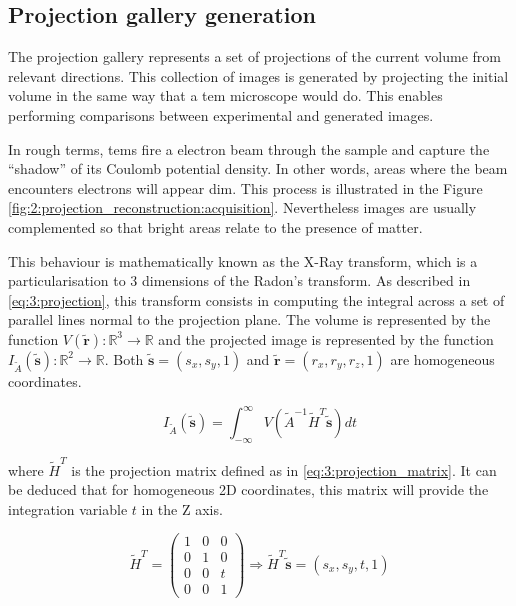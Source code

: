 \documentclass[../main.tex]{subfiles}
\begin{document}
\subsection{Projection gallery generation}
The projection gallery represents a set of projections of the current volume from relevant directions. This collection of images is generated by projecting the initial volume in the same way that a \gls{tem} microscope would do. This enables performing comparisons between experimental and generated images. 

In rough terms, \glspl{tem} fire a electron beam through the sample and capture the ``shadow'' of its Coulomb potential density\cite{sorzano2022}. In other words, areas where the beam encounters electrons will appear dim. This process is illustrated in the Figure \ref{fig:2:projection_reconstruction:acquisition}. Nevertheless images are usually complemented so that bright areas relate to the presence of matter.

This behaviour is mathematically known as the X-Ray transform, which is a particularisation to 3 dimensions of the Radon's transform. As described in \eqref{eq:3:projection}, this transform consists in computing the integral across a set of parallel lines normal to the projection plane. The volume is represented by the function $V(\bm{\tilde{r}}): \mathbb{R}^3 \rightarrow \mathbb{R}$ and the projected image is represented by the function $I_{\tilde{A}}(\bm{\tilde{s}}): \mathbb{R}^2 \rightarrow \mathbb{R}$. Both $\bm{\tilde{s}} = (s_x, s_y, 1)$ and $\bm{\tilde{r}} = (r_x, r_y, r_z, 1)$ are homogeneous coordinates\cite{sorzano2017b}.

\begin{equation}\label{eq:3:projection}
    I_{\tilde{A}}(\bm{\tilde{s}}) =
    \int_{-\infty}^{\infty} V(\tilde{A}^{-1}\tilde{H}^T\bm{\tilde{s}}) dt
\end{equation}

where $\tilde{H}^T$ is the projection matrix defined as in \eqref{eq:3:projection_matrix}. It can be deduced that for homogeneous 2D coordinates, this matrix will provide the integration variable $t$ in the Z axis.

\begin{equation}\label{eq:3:projection_matrix}
    \tilde{H}^T = 
    \begin{pmatrix}
        1 & 0 & 0 \\
        0 & 1 & 0 \\
        0 & 0 & t \\
        0 & 0 & 1
    \end{pmatrix}
    \Rightarrow
    \tilde{H}^T \bm{\tilde{s}} =
    (s_x, s_y, t, 1)
\end{equation}
\end{document}
